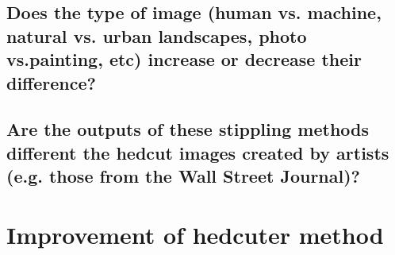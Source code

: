 \documentclass[11pt]{article}
\begin{document}
\subsection{Does the type of image (human vs. machine, natural vs. urban landscapes, photo vs.painting, etc) increase or decrease their difference?}
\subsection{Are the outputs of these stippling methods different the hedcut images created by artists (e.g. those from the Wall Street Journal)?}

\section{Improvement of hedcuter method}



\end{document}
